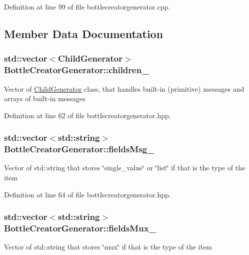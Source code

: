 Definition at line 99 of file bottlecreatorgenerator.\-cpp.



\subsection{Member Data Documentation}
\hypertarget{classBottleCreatorGenerator_a1e0f07071fec2afe0c6f0ec1f9324ba9}{
\subsubsection[{children\-\_\-}]{\setlength{\rightskip}{0pt plus 5cm}std\-::vector$<${\bf Child\-Generator}$>$ Bottle\-Creator\-Generator\-::children\-\_\-\hspace{0.3cm}{\ttfamily [private]}}}\label{classBottleCreatorGenerator_a1e0f07071fec2afe0c6f0ec1f9324ba9}
Vector of \hyperlink{classChildGenerator}{Child\-Generator} class, that handles built-\/in (primitive) messages and arrays of built-\/in messages 

Definition at line 62 of file bottlecreatorgenerator.\-hpp.

\hypertarget{classBottleCreatorGenerator_a805fb77a1f16e0816b639ae06cbca361}{
\subsubsection[{fields\-Msg\-\_\-}]{\setlength{\rightskip}{0pt plus 5cm}std\-::vector$<$std\-::string$>$ Bottle\-Creator\-Generator\-::fields\-Msg\-\_\-\hspace{0.3cm}{\ttfamily [private]}}}\label{classBottleCreatorGenerator_a805fb77a1f16e0816b639ae06cbca361}
Vector of std\-::string that stores \char`\"{}single\-\_\-value\char`\"{} or \char`\"{}list\char`\"{} if that is the type of the item 

Definition at line 64 of file bottlecreatorgenerator.\-hpp.

\hypertarget{classBottleCreatorGenerator_a5bd421cf5bc8157b46ef8d6522bc79e2}{
\subsubsection[{fields\-Mux\-\_\-}]{\setlength{\rightskip}{0pt plus 5cm}std\-::vector$<$std\-::string$>$ Bottle\-Creator\-Generator\-::fields\-Mux\-\_\-\hspace{0.3cm}{\ttfamily [private]}}}\label{classBottleCreatorGenerator_a5bd421cf5bc8157b46ef8d6522bc79e2}
Vector of std\-::string that stores \char`\"{}mux\char`\"{} if that is the type of the item 

